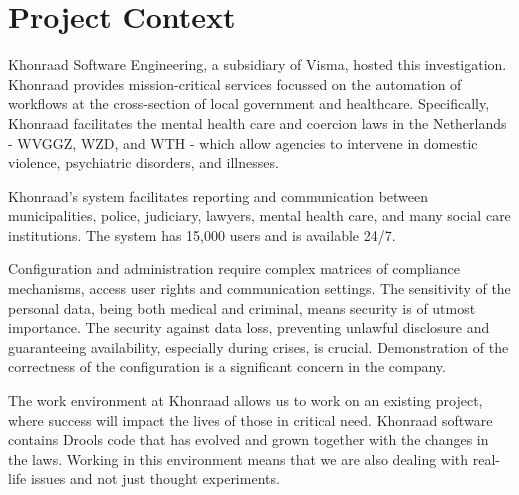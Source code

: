 \section{Project Context}

Khonraad Software Engineering, a subsidiary of Visma, hosted this investigation.
Khonraad provides mission-critical services focussed on the automation of workflows at the cross-section of local government and healthcare.
Specifically, Khonraad facilitates the mental health care and coercion laws in the Netherlands - WVGGZ, WZD, and WTH - which allow agencies to intervene in domestic violence, psychiatric disorders, and illnesses.

Khonraad's system facilitates reporting and communication between municipalities, police, judiciary, lawyers, mental health care, and many social care institutions.
The system has 15,000 users and is available 24/7.

Configuration and administration require complex matrices of compliance mechanisms, access user rights and communication settings.
The sensitivity of the personal data, being both medical and criminal, means security is of utmost importance.
The security against data loss, preventing unlawful disclosure and guaranteeing availability, especially during crises, is crucial.
Demonstration of the correctness of the configuration is a significant concern in the company.

The work environment at Khonraad allows us to work on an existing project, where success will impact the lives of those in critical need. 
Khonraad software contains Drools code that has evolved and grown together with the changes in the laws. 
Working in this environment means that we are also dealing with real-life issues and not just thought experiments.
